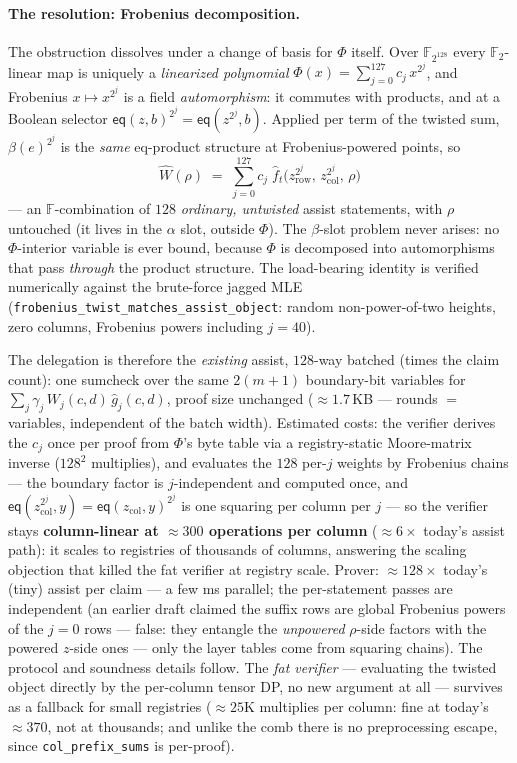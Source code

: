 \documentclass[11pt]{article}
\newcommand{\F}{\mathbb{F}}                       %
\newcommand{\eq}{\mathsf{eq}}
\newcommand{\code}[1]{\texttt{#1}}
\theoremstyle{definition}
\begin{document}
\paragraph{The resolution: Frobenius decomposition.} The obstruction
dissolves under a change of basis for $\Phi$ itself. Over
$\F_{2^{128}}$ every $\F_2$-linear map is uniquely a \emph{linearized
polynomial} $\Phi(x) = \sum_{j=0}^{127} c_j\,x^{2^j}$, and Frobenius
$x \mapsto x^{2^j}$ is a field \emph{automorphism}: it commutes with
products, and at a Boolean selector
$\eq(z, b)^{2^j} = \eq(z^{2^j}, b)$. Applied per term of the twisted
sum, $\beta(e)^{2^j}$ is the \emph{same} eq-product structure at
Frobenius-powered points, so
\[
  \widehat W(\rho) \;=\; \sum_{j=0}^{127} c_j\;
    \hat f_t\bigl(z_{\mathrm{row}}^{2^j},\, z_{\mathrm{col}}^{2^j},\,
    \rho\bigr)
\]
--- an $\F$-combination of $128$ \emph{ordinary, untwisted} assist
statements, with $\rho$ untouched (it lives in the $\alpha$ slot,
outside $\Phi$). The $\beta$-slot problem never arises: no
$\Phi$-interior variable is ever bound, because $\Phi$ is decomposed
into automorphisms that pass \emph{through} the product structure. The
load-bearing identity is verified numerically against the brute-force
jagged MLE (\code{frobenius\_twist\_matches\_assist\_object}: random
non-power-of-two heights, zero columns, Frobenius powers including
$j = 40$).

The delegation is therefore the \emph{existing} assist, $128$-way
batched (times the claim count): one sumcheck over the same $2(m{+}1)$
boundary-bit variables for $\sum_j \gamma_j\, W_j(c,d)\,\hat g_j(c,d)$,
proof size unchanged ($\approx 1.7$\,KB --- rounds $=$ variables,
independent of the batch width). Estimated costs: the verifier derives
the $c_j$ once per proof from $\Phi$'s byte table via a registry-static
Moore-matrix inverse ($128^2$ multiplies), and evaluates the $128$
per-$j$ weights by Frobenius chains --- the boundary factor is
$j$-independent and computed once, and
$\eq(z_{\mathrm{col}}^{2^j}, y) = \eq(z_{\mathrm{col}}, y)^{2^j}$ is
one squaring per column per $j$ --- so the verifier stays
\textbf{column-linear at $\approx 300$ operations per column}
($\approx 6\times$ today's assist path): it scales to registries of
thousands of columns, answering the scaling objection that killed the
fat verifier at registry scale. Prover: $\approx 128\times$ today's
(tiny) assist per claim --- a few ms parallel; the per-statement passes
are independent (an earlier draft claimed the suffix rows are global
Frobenius powers of the $j = 0$ rows --- false: they entangle the
\emph{unpowered} $\rho$-side factors with the powered $z$-side ones ---
only the layer tables come from squaring chains). The protocol and
soundness details follow. The \emph{fat verifier} ---
evaluating the twisted object directly by the per-column tensor DP, no
new argument at all --- survives as a fallback for small registries
($\approx 25$K multiplies per column: fine at today's $\approx 370$,
not at thousands; and unlike the comb there is no preprocessing escape,
since \code{col\_prefix\_sums} is per-proof).
\end{document}
